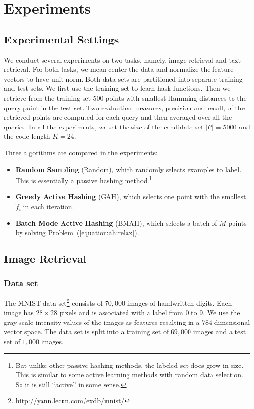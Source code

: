 \section{Experiments}
\label{AH:exps}


\subsection{Experimental Settings}

We conduct several experiments on two tasks, namely, image retrieval and text retrieval. For both tasks, we mean-center the data and normalize the feature vectors to have unit norm. Both data sets are partitioned into separate training and test sets.  We first use the training set to learn hash functions. Then we retrieve from the training set 500 points with smallest Hamming distances to the query point in the test set. Two evaluation measures, precision and recall, of the retrieved points are computed for each query and then averaged over all the queries. In all the experiments, we set the size of the candidate set $|\mathcal{C}| = 5000$ and the code length $K=24$.

Three algorithms are compared in the experiments:
\begin{itemize}
    \item \textbf{Random Sampling} (\mbox{Random}), which randomly selects examples to label. This is essentially a passive hashing method.\footnote{But unlike other passive hashing methods, the labeled set does grow in size.  This is similar to some active learning methods with random data selection.  So it is still ``active'' in some sense.}
    \item \textbf{Greedy Active Hashing} (\mbox{GAH}), which selects one point with the smallest $\tilde{f}_i$ in each iteration.
    \item \textbf{Batch Mode Active Hashing} (\mbox{BMAH}), which selects a batch of $M$ points by solving Problem~(\ref{equation:ah:relax}).
\end{itemize}


\subsection{Image Retrieval}

\subsubsection{Data set}
The \mbox{MNIST} data set\footnote{http://yann.lecun.com/exdb/mnist/} consists of $70,000$ images of handwritten digits.  Each image has $28\times28$ pixels and is associated with a label from 0 to 9. We use the gray-scale intensity values of the images as features resulting in a 784-dimensional vector space.  The data set is split into a training set of $69,000$ images and a test set of $1,000$ images.

